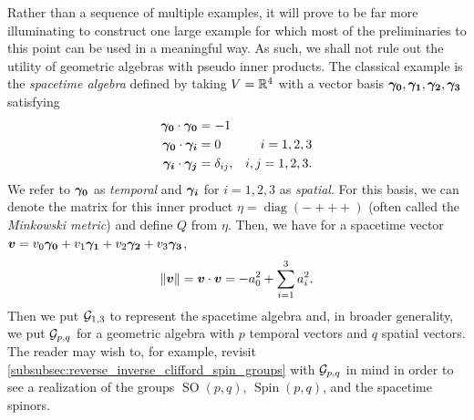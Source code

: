 Rather than a sequence of multiple examples, it will prove to be far more illuminating to construct one large example for which most of the preliminaries to this point can be used in a meaningful way. As such, we shall not rule out the utility of geometric algebras with pseudo inner products. The classical example is the \emph{spacetime algebra} defined by taking $V=\mathbb{R}^4$ with a vector basis $\boldsymbol{\gamma_0},\boldsymbol{\gamma_1},\boldsymbol{\gamma_2},\boldsymbol{\gamma_3}$ satisfying
\begin{subequations}
\begin{align}
\boldsymbol{\gamma_0} \cdot \boldsymbol{\gamma_0} &= -1\\
\boldsymbol{\gamma_0} \cdot \boldsymbol{\gamma_i} &= 0  &i=1,2,3\\
\boldsymbol{\gamma_i} \cdot \boldsymbol{\gamma_j} &= \delta_{ij}, &i,j=1,2,3.
\end{align}
\end{subequations}
We refer to $\boldsymbol{\gamma_0}$ as \emph{temporal} and $\boldsymbol{\gamma_i}$ for $i=1,2,3$ as \emph{spatial}. For this basis, we can denote the matrix for this inner product $\eta =\operatorname{diag}(-+++)$ (often called the \emph{Minkowski metric}) and define $Q$ from $\eta$. Then, we have for a spacetime vector $\boldsymbol{v} = v_0 \boldsymbol{\gamma_0} +v_1 \boldsymbol{\gamma_1} + v_2 \boldsymbol{\gamma_2} + v_3 \boldsymbol{\gamma_3}$,
\begin{equation}
\label{eq:spacetime_inner_product}
\|\boldsymbol{v}\| = \boldsymbol{v} \cdot \boldsymbol{v} = -a_0^2 + \sum_{i=1}^3 a_i^2.
\end{equation}
Then we put $\mathcal{G}_{1,3}$ to represent the spacetime algebra and, in broader generality, we put $\mathcal{G}_{p,q}$ for a geometric algebra with $p$ temporal vectors and $q$ spatial vectors. The reader may wish to, for example, revisit \cref{subsubsec:reverse_inverse_clifford_spin_groups} with $\mathcal{G}_{p,q}$ in mind in order to see a realization of the groups $\operatorname{SO}(p,q)$, $\operatorname{Spin}(p,q)$, and the spacetime spinors.

